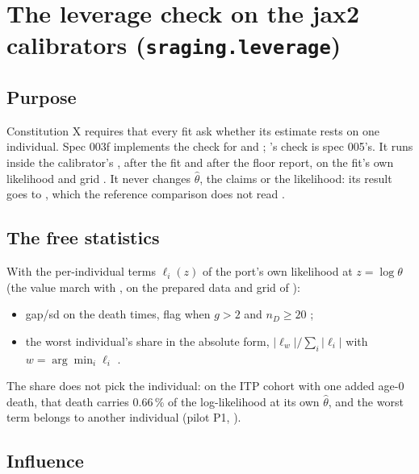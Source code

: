\section{The leverage check on the jax2 calibrators (\texttt{sraging.leverage})}\label{sec:lev}

\subsection{Purpose}\label{sec:lev-purpose}

Constitution X requires that every fit ask whether its estimate rests on one individual. Spec 003f implements the
check for  and ; 's check is spec 005's. It runs inside the
calibrator's , after the fit and after the floor report, on the fit's own likelihood and grid
. It never changes $\hat\theta$, the claims or the likelihood: its result goes
to , which the reference comparison does not read .

\subsection{The free statistics}\label{sec:lev-free}

With the per-individual terms $\ell_i(z)$ of the port's own likelihood at $z=\log\theta$ (the value march with
, on the prepared data and grid of ):
\begin{itemize}[nosep]
  \item gap/sd on the death times, flag when $g>2$ and $n_D\ge 20$ ;
  \item the worst individual's share in the absolute form, $|\ell_w|/\sum_i|\ell_i|$ with $w=\arg\min_i\ell_i$
    .
\end{itemize}
The share does not pick the individual: on the ITP cohort with one added age-0 death, that death carries 0.66\,\% of the
log-likelihood at its own $\hat\theta$, and the worst term belongs to another individual (pilot P1,
).

\subsection{Influence}\label{sec:lev-influence}

